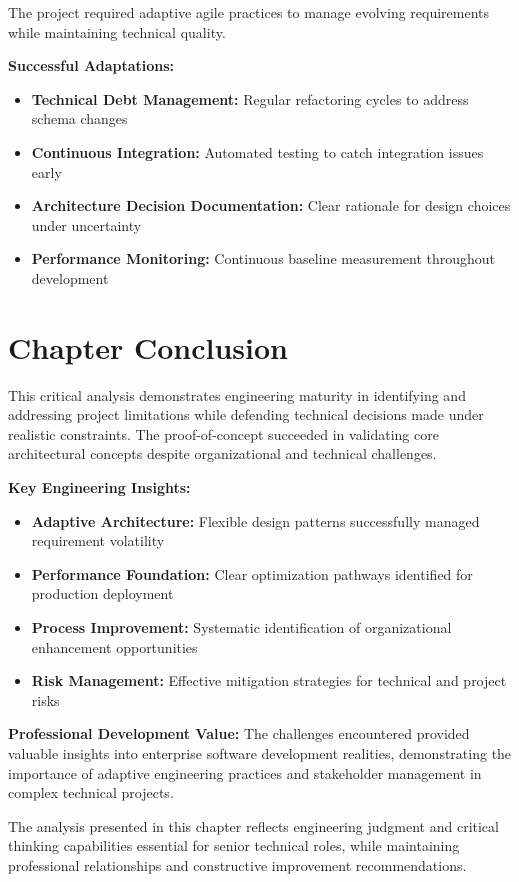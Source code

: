 The project required adaptive agile practices to manage evolving requirements while maintaining technical quality.

\textbf{Successful Adaptations:}
\begin{itemize}
    \item \textbf{Technical Debt Management:} Regular refactoring cycles to address schema changes
    \item \textbf{Continuous Integration:} Automated testing to catch integration issues early
    \item \textbf{Architecture Decision Documentation:} Clear rationale for design choices under uncertainty
    \item \textbf{Performance Monitoring:} Continuous baseline measurement throughout development
\end{itemize}

\section{Chapter Conclusion}

This critical analysis demonstrates engineering maturity in identifying and addressing project limitations while defending technical decisions made under realistic constraints. The proof-of-concept succeeded in validating core architectural concepts despite organizational and technical challenges.

\textbf{Key Engineering Insights:}
\begin{itemize}
    \item \textbf{Adaptive Architecture:} Flexible design patterns successfully managed requirement volatility
    \item \textbf{Performance Foundation:} Clear optimization pathways identified for production deployment
    \item \textbf{Process Improvement:} Systematic identification of organizational enhancement opportunities
    \item \textbf{Risk Management:} Effective mitigation strategies for technical and project risks
\end{itemize}

\textbf{Professional Development Value:}
The challenges encountered provided valuable insights into enterprise software development realities, demonstrating the importance of adaptive engineering practices and stakeholder management in complex technical projects.

The analysis presented in this chapter reflects engineering judgment and critical thinking capabilities essential for senior technical roles, while maintaining professional relationships and constructive improvement recommendations.

\pagebreak